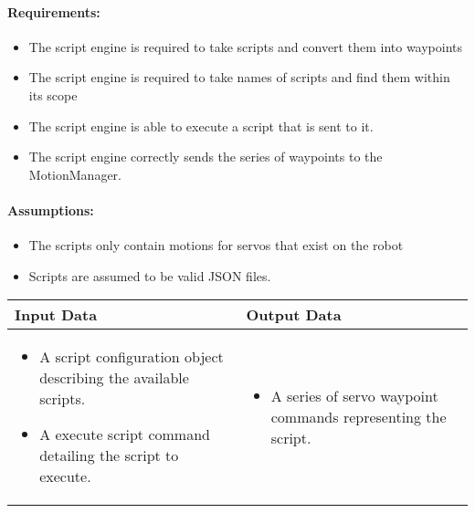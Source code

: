 \documentclass[english,12pt]{scrartcl}
\begin{document}
		\paragraph{Requirements:}
		\begin{itemize}
			\item The script engine is required to take scripts and convert them into waypoints
			\item The script engine is required to take names of scripts and find them within its scope
			\item The script engine is able to execute a script that is sent to it.
			\item The script engine correctly sends the series of waypoints to the MotionManager.
		\end{itemize}

		\paragraph{Assumptions:}
		\begin{itemize}
			\item The scripts only contain motions for servos that exist on the robot
			\item Scripts are assumed to be valid JSON files.
		\end{itemize}

		\begin{tabular}{p{7cm}|p{7cm}}
			\textbf{Input Data} & \textbf{Output Data} \\ \hline
			\begin{itemize}
				\item A script configuration object describing the available scripts.
				\item A execute script command detailing the script to execute.
			\end{itemize}
			&
			\begin{itemize}
				\item A series of servo waypoint commands representing the script.
			\end{itemize}
		\end{tabular}
\end{document}
